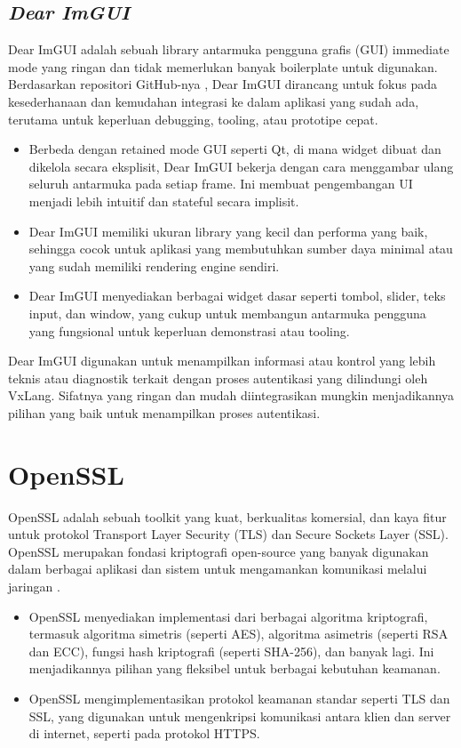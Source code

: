 \subsection{\textit{Dear ImGUI}}
Dear ImGUI adalah sebuah library antarmuka pengguna grafis (GUI) immediate mode yang ringan dan tidak memerlukan banyak boilerplate untuk digunakan. Berdasarkan repositori GitHub-nya \cite{ImGui}, Dear ImGUI dirancang untuk fokus pada kesederhanaan dan kemudahan integrasi ke dalam aplikasi yang sudah ada, terutama untuk keperluan debugging, tooling, atau prototipe cepat.

\begin{itemize}
	\item {} Berbeda dengan retained mode GUI seperti Qt, di mana widget dibuat dan dikelola secara eksplisit, Dear ImGUI bekerja dengan cara menggambar ulang seluruh antarmuka pada setiap frame. Ini membuat pengembangan UI menjadi lebih intuitif dan stateful secara implisit.
	\item {} Dear ImGUI memiliki ukuran library yang kecil dan performa yang baik, sehingga cocok untuk aplikasi yang membutuhkan sumber daya minimal atau yang sudah memiliki rendering engine sendiri.
	\item {} Dear ImGUI menyediakan berbagai widget dasar seperti tombol, slider, teks input, dan window, yang cukup untuk membangun antarmuka pengguna yang fungsional untuk keperluan demonstrasi atau tooling.
\end{itemize}

Dear ImGUI digunakan untuk menampilkan informasi atau kontrol yang lebih teknis atau diagnostik terkait dengan proses autentikasi yang dilindungi oleh VxLang. Sifatnya yang ringan dan mudah diintegrasikan mungkin menjadikannya pilihan yang baik untuk menampilkan proses autentikasi.

\section{OpenSSL}
OpenSSL adalah sebuah toolkit yang kuat, berkualitas komersial, dan kaya fitur untuk protokol Transport Layer Security (TLS) dan Secure Sockets Layer (SSL). OpenSSL merupakan fondasi kriptografi open-source yang banyak digunakan dalam berbagai aplikasi dan sistem untuk mengamankan komunikasi melalui jaringan \cite{OpenSSL}.

\begin{itemize}
	\item {} OpenSSL menyediakan implementasi dari berbagai algoritma kriptografi, termasuk algoritma simetris (seperti AES), algoritma asimetris (seperti RSA dan ECC), fungsi hash kriptografi (seperti SHA-256), dan banyak lagi. Ini menjadikannya pilihan yang fleksibel untuk berbagai kebutuhan keamanan.
	\item {} OpenSSL mengimplementasikan protokol keamanan standar seperti TLS dan SSL, yang digunakan untuk mengenkripsi komunikasi antara klien dan server di internet, seperti pada protokol HTTPS.
\end{itemize}


